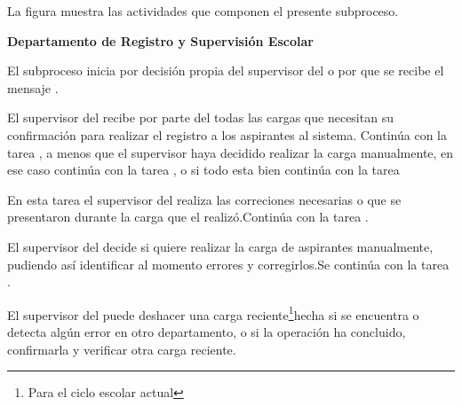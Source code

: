 La figura  muestra las actividades que componen el presente subproceso.



\begin{PDescripcion}
	

	\Ppaso \textbf{Departamento de Registro y Supervisión Escolar}
	\begin{enumerate}
		\Ppaso [\Einicio] El subproceso inicia por decisión propia del supervisor del  o por que se recibe el mensaje .
		
		\Ppaso [\itarea]  El supervisor del  recibe por parte del  todas las cargas que necesitan su confirmación para realizar el registro a los aspirantes al sistema. Continúa con la tarea , a menos que el supervisor haya decidido realizar la carga manualmente, en ese caso continúa con la tarea , o si todo esta bien continúa con la tarea 
		
		\Ppaso [\itarea]  En esta tarea el supervisor del  realiza las correciones necesarias o que se presentaron durante la carga que el  realizó.Continúa con la tarea .
		
		\Ppaso [\itarea]  El supervisor del  decide si quiere realizar la carga de aspirantes manualmente, pudiendo así identificar al momento errores y corregirlos.Se continúa con la tarea .
		
		
		\Ppaso [\itarea]  El supervisor del  puede deshacer una carga reciente\footnote{Para el ciclo escolar actual}hecha si se encuentra o detecta algún error en otro departamento, o si la operación ha concluido, confirmarla y verificar otra carga reciente.
	\end{enumerate}
	 
	
\end{PDescripcion}


